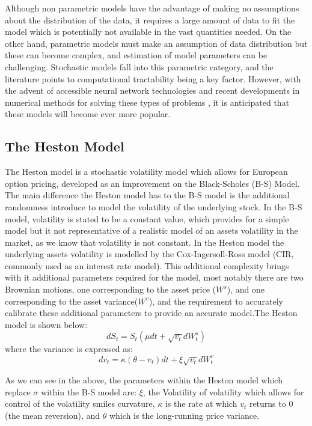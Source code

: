 \documentclass[12pt,oneside]{article}
\begin{document}
Although non parametric models have the advantage of making no assumptions about the distribution of the data, it requires a large amount of data to fit the model which is potentially not available in the vast quantities needed. On the other hand, parametric models must make an assumption of data distribution but these can become complex, and estimation of model parameters can be challenging. Stochastic models fall into this parametric category, and the literature points to computational tractability being a key factor. However, with the advent of accessible neural network technologies and recent developments in numerical methods for solving these types of problems \cite{horvath2019functional}, it is anticipated that these models will become ever more popular.


\subsection{The Heston Model}
The Heston model is a stochastic volatility model which allows for European option pricing, developed as an improvement on the Black-Scholes (B-S) Model. The main difference the Heston model has to the B-S model is the additional randomness introduce to model the volatility of the underlying stock. In the B-S model, volatility is stated to be a constant value, which provides for a simple model but it not representative of a realistic model of an assets volatility in the market, as we know that volatility is not constant. In the Heston model the underlying assets volatility is modelled by the Cox-Ingersoll-Ross model (CIR, commonly used as an interest rate model). This additional complexity brings with it additional parameters required for the model, most notably there are two Brownian motions, one corresponding to the asset price ($W^s$), and one corresponding to the asset variance($W^v$), and the requirement to accurately calibrate these additional parameters to provide an accurate model.The Heston model is shown below: 
\begin{equation}
\label{eqn:classic_heston}
dS_t= S_t(\mu dt + \sqrt{v_t} dW_t^{s})
\end{equation}
where the variance is expressed as: 
\begin{equation}
\label{eqn:classic_heston_var}
dv_t = \kappa (\theta - v_t)dt + \xi\sqrt{v_t}dW_t^{v}
\end{equation}

As we can see in the above, the parameters within the Heston model which replace $\sigma$ within the B-S model are: $\xi$, the Volatility of volatility which allows for control of the volatility smiles curvature, $\kappa$ is the rate at which $v_t$ returns to 0 (the mean reversion), and $\theta$ which is the long-running price variance. 
\end{document}
